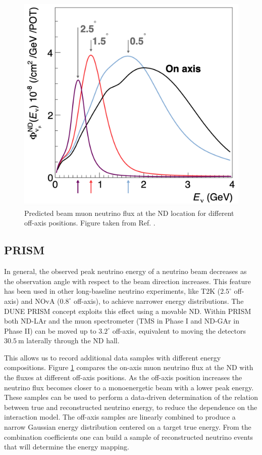 \begin{figure}[t]
	\centering
	\includegraphics[width=0.55\linewidth]{Images/DUNE/ND/prism_spectra}
	\caption[Predicted beam muon neutrino flux at the ND location for different off-axis positions.]{Predicted beam muon neutrino flux at the ND location for different off-axis positions. Figure taken from Ref. \cite{DUNE2021NDCDR}.}
	\label{fig:dune_prism}
\end{figure}

\subsection{PRISM}

In general, the observed peak neutrino energy of a neutrino beam decreases as the observation angle with respect to the beam direction increases. This feature has been used in other long-baseline neutrino experiments, like T2K ($2.5^{\circ}$ off-axis) and NOvA ($0.8^{\circ}$ off-axis), to achieve narrower energy distributions. The DUNE PRISM concept exploits this effect using a movable ND. Within PRISM both ND-LAr and the muon spectrometer (TMS in Phase I and ND-GAr in Phase II) can be moved up to $3.2^{\circ}$ off-axis, equivalent to moving the detectors $30.5~\mathrm{m}$ laterally through the ND hall.

This allows us to record additional data samples with different energy compositions. Figure \ref{fig:dune_prism} compares the on-axis muon neutrino flux at the ND with the fluxes at different off-axis positions. As the off-axis position increases the neutrino flux becomes closer to a monoenergetic beam with a lower peak energy. These samples can be used to perform a data-driven determination of the relation between true and reconstructed neutrino energy, to reduce the dependence on the interaction model. The off-axis samples are linearly combined to produce a narrow Gaussian energy distribution centered on a target true energy. From the combination coefficients one can build a sample of reconstructed neutrino events that will determine the energy mapping.

